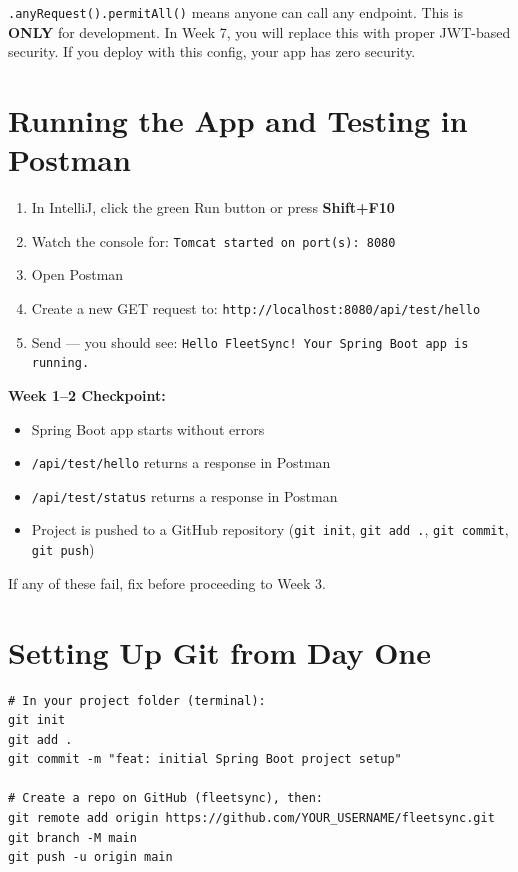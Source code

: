 \documentclass[12pt,a4paper]{report}
\newcommand{\code}[1]{\texttt{\textcolor{keywordblue}{#1}}}
\begin{document}
\begin{tcolorbox}[warnbox]
\code{.anyRequest().permitAll()} means anyone can call any endpoint. This is \textbf{ONLY} for development. In Week 7, you will replace this with proper JWT-based security. If you deploy with this config, your app has zero security.
\end{tcolorbox}

\section{Running the App and Testing in Postman}

\begin{enumerate}
  \item In IntelliJ, click the green Run button or press \textbf{Shift+F10}
  \item Watch the console for: \code{Tomcat started on port(s): 8080}
  \item Open Postman
  \item Create a new GET request to: \code{http://localhost:8080/api/test/hello}
  \item Send --- you should see: \code{Hello FleetSync! Your Spring Boot app is running.}
\end{enumerate}

\begin{tcolorbox}[successbox]
\textbf{Week 1--2 Checkpoint:}
\begin{itemize}
  \item[$\checkmark$] Spring Boot app starts without errors
  \item[$\checkmark$] \code{/api/test/hello} returns a response in Postman
  \item[$\checkmark$] \code{/api/test/status} returns a response in Postman
  \item[$\checkmark$] Project is pushed to a GitHub repository (\code{git init}, \code{git add .}, \code{git commit}, \code{git push})
\end{itemize}
If any of these fail, fix before proceeding to Week 3.
\end{tcolorbox}

\section{Setting Up Git from Day One}

\begin{lstlisting}[style=bashstyle,caption=Initial Git Setup]
# In your project folder (terminal):
git init
git add .
git commit -m "feat: initial Spring Boot project setup"

# Create a repo on GitHub (fleetsync), then:
git remote add origin https://github.com/YOUR_USERNAME/fleetsync.git
git branch -M main
git push -u origin main
\end{lstlisting}
\end{document}
